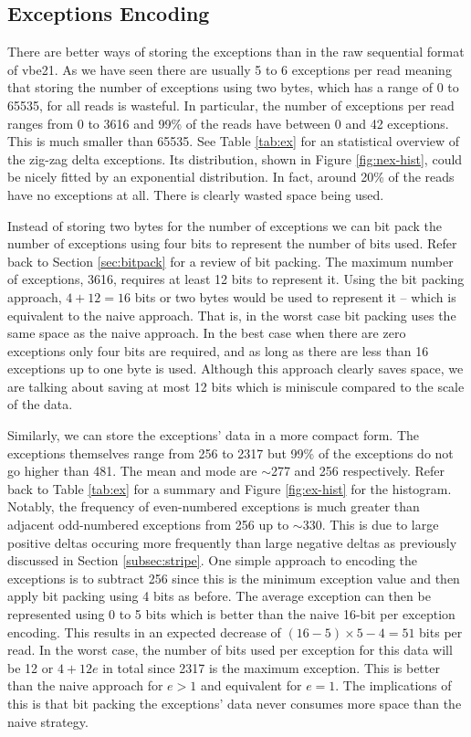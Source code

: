\subsection{Exceptions Encoding}

There are better ways of storing the exceptions than in the raw sequential
format of vbe21.
As we have seen there are usually 5 to 6 exceptions per read meaning that
storing the number of exceptions using two bytes, which has a range of 0 to 65535,
for all reads is wasteful.
In particular, the number of exceptions per read ranges from 0 to 3616 and 99\%
of the reads have between 0 and 42 exceptions. This is much smaller than 65535.
See Table \ref{tab:ex} for an statistical overview of the zig-zag delta
exceptions. Its distribution, shown in Figure \ref{fig:nex-hist}, could be
nicely fitted by an exponential distribution. In fact, around 20\% of the reads
have no exceptions at all. There is clearly wasted space being used.




Instead of storing two bytes for the number of exceptions we can bit pack the
number of exceptions using four bits to represent the number of bits used.
Refer back to Section \ref{sec:bitpack} for a review of bit packing.
The maximum number of exceptions, 3616, requires at least
12 bits to represent it. Using the bit packing approach, $4+12=16$ bits or two
bytes would be used to represent it -- which is equivalent to the naive
approach. That is, in the worst case bit packing uses the same space as the naive
approach. In the best case when there are zero exceptions only four bits are
required, and as long as there are less than 16 exceptions up to one byte is
used. Although this approach clearly saves space, we are talking about saving at
most 12 bits which is miniscule compared to the scale of the data.

Similarly, we can store the exceptions' data in a more compact form.
The exceptions themselves range from 256 to 2317 but 99\%
of the exceptions do not go higher than 481. The mean and mode are $\sim$277 and
256 respectively. Refer back to Table \ref{tab:ex} for a summary and Figure
\ref{fig:ex-hist} for the histogram. Notably, the frequency of even-numbered
exceptions is much greater than adjacent odd-numbered exceptions from 256 up to
$\sim$330. This is due to large positive deltas occuring more frequently than
large negative deltas as previously discussed in Section \ref{subsec:stripe}.
One simple approach to encoding the exceptions is to subtract 256 since this is
the minimum exception value and then apply bit packing using 4 bits as before. The
average exception can then be represented using
0 to 5 bits which is better than the naive 16-bit per exception encoding. This
results in an expected decrease of $(16-5)\times 5-4=51$ bits per read.
In the worst case, the number of bits used per exception for this data will be 12
or $4 + 12e$ in total since 2317 is the maximum exception. This is better than
the naive approach for $e>1$ and equivalent for $e=1$. The implications of this
is that bit packing the exceptions' data never consumes more space than the
naive strategy.

